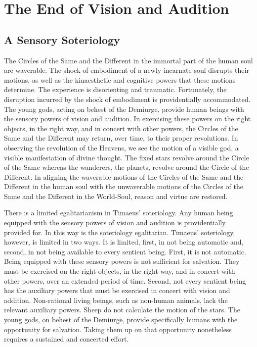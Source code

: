 \chapter{The End of Vision and Audition} %
\label{cha:the_end_of_vision_and_audition}

\section{A Sensory Soteriology} %
\label{sec:a_sensory_soteriology}
The Circles of the Same and the Different in the immortal part of the human soul are waverable. The shock of embodiment of a newly incarnate soul disrupts their motions, as well as the kinaesthetic and cognitive powers that these motions determine. The experience is disorienting and traumatic. Fortunately, the disruption incurred by the shock of embodiment is providentially accommodated. The young gods, acting on behest of the Demiurge, provide human beings with the sensory powers of vision and audition. In exercising these powers on the right objects, in the right way, and in concert with other powers, the Circles of the Same and the Different may return, over time, to their proper revolutions. In observing the revolution of the Heavens, we see the motion of a visible god, a visible manifestation of divine thought. The fixed stars revolve around the Circle of the Same whereas the wanderers, the planets, revolve around the Circle of the Different. In aligning the waverable motions of the Circles of the Same and the Different in the human soul with the unwaverable motions of the Circles of the Same and the Different in the World-Soul, reason and virtue are restored. 

There is a limited egalitarianism in Timaeus' soteriology. Any human being equip\-ped with the sensory powers of vision and audition is providentially provided for. In this way is the soteriology egalitarian. Timaeus' soteriology, however, is limited in two ways. It is limited, first, in not being automatic and, second, in not being available to every sentient being. First, it is not automatic. Being equipped with these sensory powers is not sufficient for salvation. They must be exercised on the right objects, in the right way, and in concert with other powers, over an extended period of time. Second, not every sentient being has the auxiliary powers that must be exercised in concert with vision and addition. Non-rational living beings, such as non-human animals, lack the relevant auxiliary powers. Sheep do not calculate the motion of the stars. The young gods, on behest of the Demiurge, provide specifically humans with the opportunity for salvation. Taking them up on that opportunity nonetheless requires a sustained and concerted effort.


